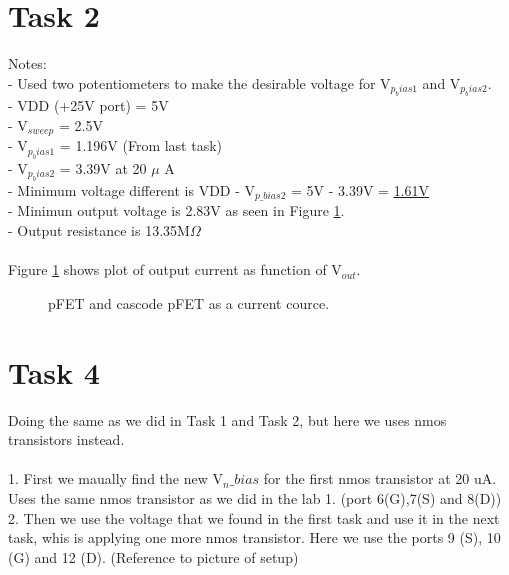 \documentclass[a4paper,english,11pt]{article}
\begin{document}
\newpage
\section{Task 2}
Notes:\\
- Used two potentiometers to make the desirable voltage for V$_{p_bias1}$ and V$_{p_bias2}$.\\
- VDD (+25V port) = 5V\\
- V$_{sweep}$ = 2.5V\\
- V$_{p_bias1}$ = 1.196V (From last task)\\
- V$_{p_bias2}$ = 3.39V at 20 $\mu$ A\\
- Minimum voltage different is VDD - V$_{p\_bias2}$ = 5V - 3.39V = \underline{\underline{1.61V}}\\
- Minimun output voltage is 2.83V as seen in Figure \ref{fig:pfet-cascode-pfet}.\\
- Output resistance is 13.35M$\Omega$\\
\\
Figure \ref{fig:pfet-cascode-pfet} shows plot of output current as function of V$_{out}$.
\begin{figure}[htbp]
 \centering
  \caption{pFET and cascode pFET as a current cource.}
  \label{fig:pfet-cascode-pfet}	
\end{figure}

\newpage
\section{Task 4}
Doing the same as we did in Task 1 and Task 2, but here we uses nmos transistors instead.\\
\\
1. First we maually find the new V$_n\_bias$ for the first nmos transistor at 20 uA.\\
Uses the same nmos transistor as we did in the lab 1. (port 6(G),7(S) and 8(D))\\
2. Then we use the voltage that we found in the first task and use it in the next task, whis is applying one more nmos transistor. Here we
use the ports 9 (S), 10 (G) and 12 (D). (Reference to picture of setup)
\end{document}
